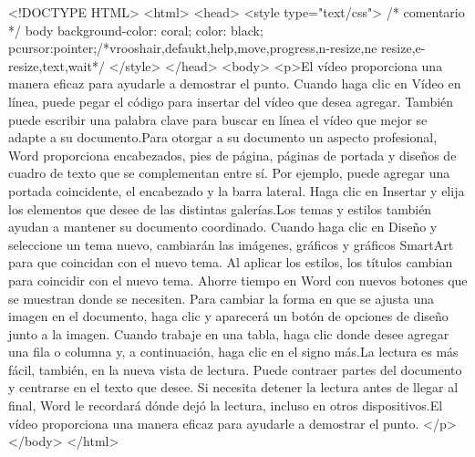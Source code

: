 <!DOCTYPE HTML>
<html>
<head>
<style type="text/css">
/* comentario */
body{
        background-color: coral;
        color: black;
    }
p{cursor:pointer;}/*vrooshair,defaukt,help,move,progress,n-resize,ne resize,e-resize,text,wait*/
</style>
</head>
<body>
<p>El vídeo proporciona una manera eficaz para ayudarle a demostrar el punto. Cuando haga clic en Vídeo en línea, puede pegar el código para insertar del vídeo que desea agregar. También puede escribir una palabra clave para buscar en línea el vídeo que mejor se adapte a su documento.Para otorgar a su documento un aspecto profesional, Word proporciona encabezados, pies de página, páginas de portada y diseños de cuadro de texto que se complementan entre sí. Por ejemplo, puede agregar una portada coincidente, el encabezado y la barra lateral. Haga clic en Insertar y elija los elementos que desee de las distintas galerías.Los temas y estilos también ayudan a mantener su documento coordinado. Cuando haga clic en Diseño y seleccione un tema nuevo, cambiarán las imágenes, gráficos y gráficos SmartArt para que coincidan con el nuevo tema.
    Al aplicar los estilos, los títulos cambian para coincidir con el nuevo tema. Ahorre tiempo en Word con nuevos botones que se muestran donde se necesiten. Para cambiar la forma en que se ajusta una imagen en el documento, haga clic y aparecerá un botón de opciones de diseño junto a la imagen. Cuando trabaje en una tabla, haga clic donde desee agregar una fila o columna y, a continuación, haga clic en el signo más.La lectura es más fácil, también, en la nueva vista de lectura. Puede contraer partes del documento y centrarse en el texto que desee. Si necesita detener la lectura antes de llegar al final, Word le recordará dónde dejó la lectura, incluso en otros dispositivos.El vídeo proporciona una manera eficaz para ayudarle a demostrar el punto.
</p>
</body>
</html>